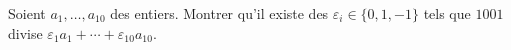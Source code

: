 Soient $a_1, \ldots, a_{10}$ des entiers. Montrer qu'il existe des $\varepsilon_i \in \{0, 1, -1\}$ tels que $1001$ divise $\varepsilon_1 a_1 + \cdots + \varepsilon_{10} a_{10}$.
